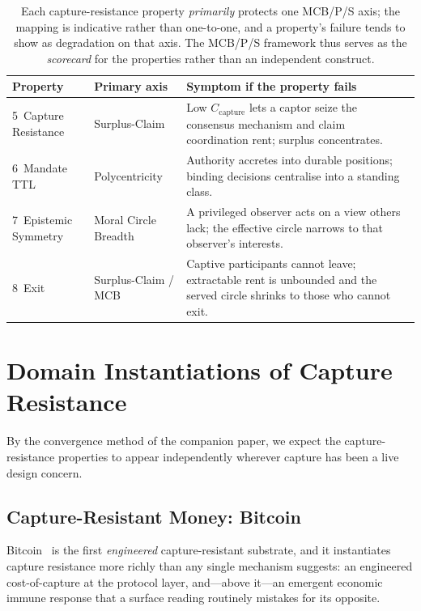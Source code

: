 \documentclass[11pt]{article}
\theoremstyle{definition}
\theoremstyle{plain}
\begin{document}
\begin{table}[!ht]
\centering
\small
\renewcommand{\arraystretch}{1.2}
\begin{tabularx}{\textwidth}{@{}llX@{}}
\toprule
\textbf{Property} & \textbf{Primary axis} & \textbf{Symptom if the property fails} \\
\midrule
5 \,Capture Resistance & Surplus-Claim & Low $C_{\text{capture}}$ lets a captor seize the consensus mechanism and claim coordination rent; surplus concentrates. \\
6 \,Mandate TTL & Polycentricity & Authority accretes into durable positions; binding decisions centralise into a standing class. \\
7 \,Epistemic Symmetry & Moral Circle Breadth & A privileged observer acts on a view others lack; the effective circle narrows to that observer's interests. \\
8 \,Exit & Surplus-Claim / MCB & Captive participants cannot leave; extractable rent is unbounded and the served circle shrinks to those who cannot exit. \\
\bottomrule
\end{tabularx}
\caption{Each capture-resistance property \emph{primarily} protects one MCB/P/S axis;
the mapping is indicative rather than one-to-one, and a property's failure tends to
show as degradation on that axis. The MCB/P/S framework thus serves as the
\emph{scorecard} for the properties rather than an independent construct.}
\label{tab:propaxis}
\end{table}

\section{Domain Instantiations of Capture Resistance}
\label{sec:domains}

By the convergence method of the companion paper, we expect the capture-resistance
properties to appear independently wherever capture has been a live design concern.

\subsection{Capture-Resistant Money: Bitcoin}

Bitcoin~\cite{nakamoto2008} is the first \emph{engineered} capture-resistant
substrate, and it instantiates capture resistance more richly than any single
mechanism suggests: an engineered cost-of-capture at the protocol layer, and---above
it---an emergent economic immune response that a surface reading routinely mistakes
for its opposite.
\end{document}
